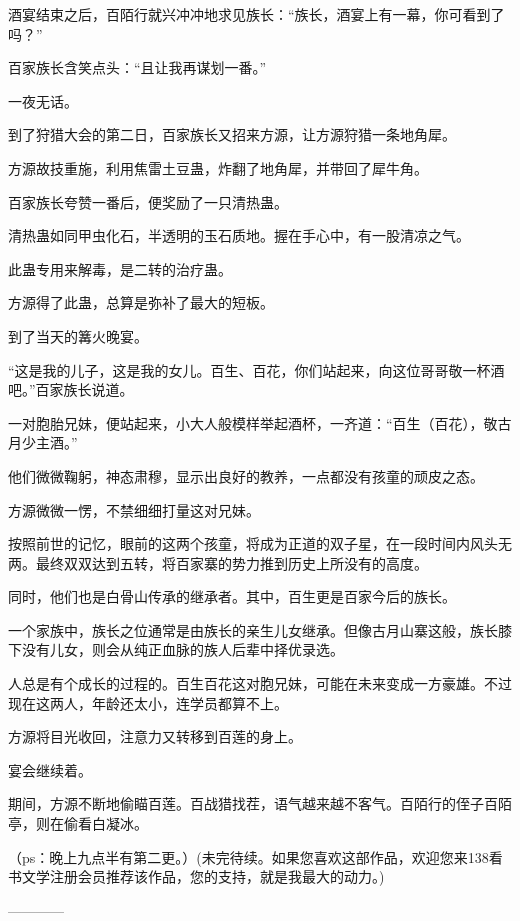 \begin{this_body}
酒宴结束之后，百陌行就兴冲冲地求见族长：“族长，酒宴上有一幕，你可看到了吗？”

百家族长含笑点头：“且让我再谋划一番。”

一夜无话。

到了狩猎大会的第二日，百家族长又招来方源，让方源狩猎一条地角犀。

方源故技重施，利用焦雷土豆蛊，炸翻了地角犀，并带回了犀牛角。

百家族长夸赞一番后，便奖励了一只清热蛊。

清热蛊如同甲虫化石，半透明的玉石质地。握在手心中，有一股清凉之气。

此蛊专用来解毒，是二转的治疗蛊。

方源得了此蛊，总算是弥补了最大的短板。

到了当天的篝火晚宴。

“这是我的儿子，这是我的女儿。百生、百花，你们站起来，向这位哥哥敬一杯酒吧。”百家族长说道。

一对胞胎兄妹，便站起来，小大人般模样举起酒杯，一齐道：“百生（百花），敬古月少主酒。”

他们微微鞠躬，神态肃穆，显示出良好的教养，一点都没有孩童的顽皮之态。

方源微微一愣，不禁细细打量这对兄妹。

按照前世的记忆，眼前的这两个孩童，将成为正道的双子星，在一段时间内风头无两。最终双双达到五转，将百家寨的势力推到历史上所没有的高度。

同时，他们也是白骨山传承的继承者。其中，百生更是百家今后的族长。

一个家族中，族长之位通常是由族长的亲生儿女继承。但像古月山寨这般，族长膝下没有儿女，则会从纯正血脉的族人后辈中择优录选。

人总是有个成长的过程的。百生百花这对胞兄妹，可能在未来变成一方豪雄。不过现在这两人，年龄还太小，连学员都算不上。

方源将目光收回，注意力又转移到百莲的身上。

宴会继续着。

期间，方源不断地偷瞄百莲。百战猎找茬，语气越来越不客气。百陌行的侄子百陌亭，则在偷看白凝冰。

（ps：晚上九点半有第二更。）(未完待续。如果您喜欢这部作品，欢迎您来138看书文学注册会员推荐该作品，您的支持，就是我最大的动力。)

------------

\end{this_body}

